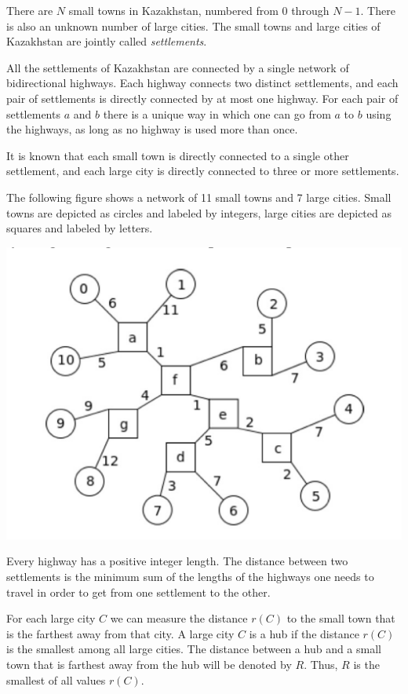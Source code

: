 There are $N$ small towns in Kazakhstan, numbered from $0$ through $N - 1$. There is also an unknown number of large cities. The small towns and large cities of Kazakhstan are jointly called \textit{settlements}.

All the settlements of Kazakhstan are connected by a single network of bidirectional highways. Each highway connects two distinct settlements, and each pair of settlements is directly connected by at most one highway. For each pair of settlements $a$ and $b$ there is a unique way in which one can go from $a$ to $b$ using the highways, as long as no highway is used more than once.

It is known that each small town is directly connected to a single other settlement, and each large city is directly connected to three or more settlements.

The following figure shows a network of 11 small towns and 7 large cities. Small towns are depicted as circles and labeled by integers, large cities are depicted as squares and labeled by letters.

\includegraphics[scale=0.8]{towns.png}

Every highway has a positive integer length. The distance between two settlements is the minimum sum of the lengths of the highways one needs to travel in order to get from one settlement to the other.

For each large city $C$ we can measure the distance $r(C)$ to the small town that is the farthest away from that city. A large city $C$ is a hub if the distance $r(C)$ is the smallest among all large cities. The distance between a hub and a small town that is farthest away from the hub will be denoted by $R$. Thus, $R$ is the smallest of all values $r(C)$.

